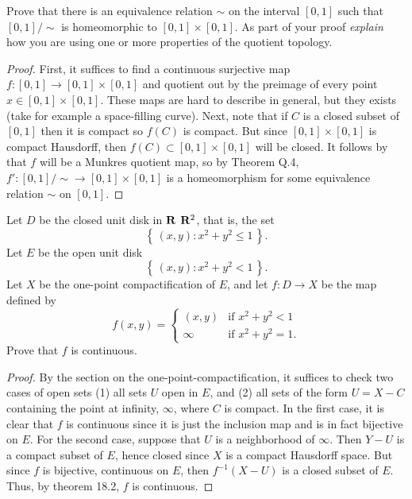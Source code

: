 \begin{problem}
Prove that there is an equivalence relation $\sim$ on the interval $[0,1]$
such that $[0,1]/{\sim}$ is homeomorphic to $[0,1]\times[0,1]$. As part of
your proof \emph{explain} how you are using one or more properties of the
quotient topology.
\end{problem}
\begin{proof}
First, it suffices to find a continuous surjective map $f\colon[0,1]\to
[0,1]\times[0,1]$ and quotient out by the preimage of every point
$x\in[0,1]\times[0,1]$. These maps are hard to describe in general, but
they exists (take for example a space-filling curve). Next, note that if
$C$ is a closed subset of $[0,1]$ then it is compact so $f(C)$ is
compact. But since $[0,1]\times[0,1]$ is compact Hausdorff, then
$f(C)\subset[0,1]\times[0,1]$ will be closed. It follows by that $f$ will
be a Munkres quotient map, so by Theorem Q.4, $f'\colon
[0,1]/{\sim}\to[0,1]\times[0,1]$ is a homeomorphism for some equivalence
relation $\sim$ on $[0,1]$.
\end{proof}

\begin{problem}
Let $D$ be the closed unit disk in $\mathbf{R}$ ${\mathbf{R}}^2$, that is, the set
\[
\left\{\,(x,y):x^2+y^2\leq 1\,\right\}.
\]
Let $E$ be the open unit disk
\[
\left\{\,(x,y):x^2+y^2<1\,\right\}.
\]
Let $X$ be the one-point compactification of $E$, and let $f\colon D\to X$
be the map defined by
\[
f(x,y)=
\begin{cases}
(x,y)&\text{if $x^2+y^2<1$}\\
\infty&\text{if $x^2+y^2=1$.}
\end{cases}
\]
Prove that $f$ is continuous.
\end{problem}
\begin{proof}
By the section on the one-point-compactification, it suffices to check two
cases of open sets (1) all sets $U$ open in $E$, and (2) all sets of the
form $U=X\minus C$ containing the point at infinity, $\infty$, where $C$ is
compact. In the first case, it is clear that $f$ is continuous since it is
just the inclusion map and is in fact bijective on $E$. For the second
case, suppose that $U$ is a neighborhood of $\infty$. Then $Y-U$ is a
compact subset of $E$, hence closed since $X$ is a compact Hausdorff
space. But since $f$ is bijective, continuous on $E$, then $f^{-1}(X-U)$ is
a closed subset of $E$. Thus, by theorem 18.2, $f$ is continuous.
\end{proof}

